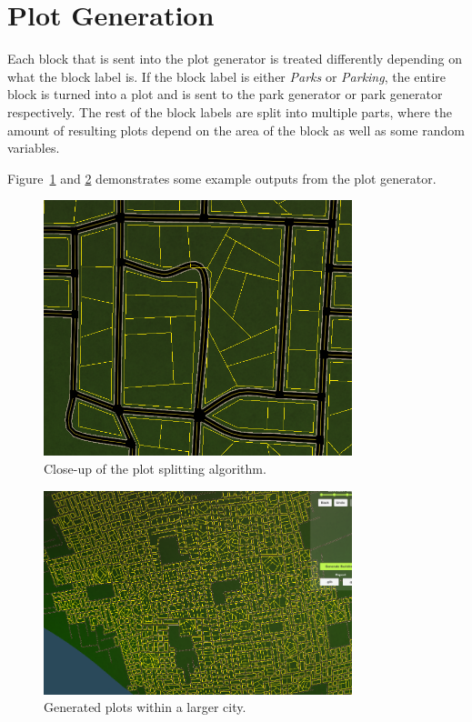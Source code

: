 \section{Plot Generation}
Each block that is sent into the plot generator is treated differently depending on what the block label is. 
If the block label is either \textit{Parks} or \textit{Parking}, the entire block is turned into a plot and is sent to the park generator or park generator respectively.
The rest of the block labels are split into multiple parts, where the amount of resulting plots depend on the area of the block as well as some random variables. 

Figure~\ref{fig:plot2} and \ref{fig:plot} demonstrates some example outputs from the plot generator.

\begin{figure}[H]
  \centering

  \includegraphics[width=0.8\textwidth]{figure/plot2.png}
  \caption{Close-up of the plot splitting algorithm.}

  \label{fig:plot2}
\end{figure}

\begin{figure}[H]
  \centering

  \includegraphics[width=0.8\textwidth]{figure/plot.png}
  \caption{Generated plots within a larger city.}

  \label{fig:plot}
\end{figure}

